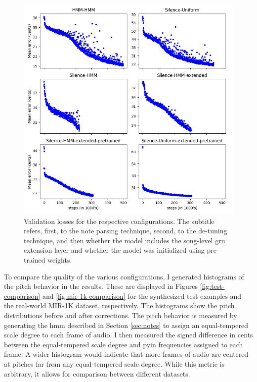 \begin{figure}[t]
    \centering
    \includegraphics[width=\columnwidth]{figures/losses_plots.png}
    \caption{Validation losses for the respective configurations. The subtitle refers, first, to the note parsing technique, second, to the de-tuning technique, and then whether the model includes the song-level \gls{gru} extension layer and whether the model was initialized using pre-trained weights.}
    \label{fig:losses_plots}
\end{figure}

To compare the quality of the various configurations, I generated histograms of the pitch behavior in the results. These are displayed in Figures \ref{fig:test-comparison} and \ref{fig:mir-1k-comparison} for the synthesized test examples and the real-world MIR-1K dataset, respectively. The histograms show the pitch distributions before and after corrections. The pitch behavior is measured by generating the \gls{hmm} described in Section \ref{sec:notes} to assign an equal-tempered scale degree to each frame of audio. I then measured the signed difference in cents between the equal-tempered scale degree and \gls{pyin} frequencies assigned to each frame. A wider histogram would indicate that more frames of audio are centered at pitches far from any equal-tempered scale degree. While this metric is arbitrary, it allows for comparison between different datasets.

